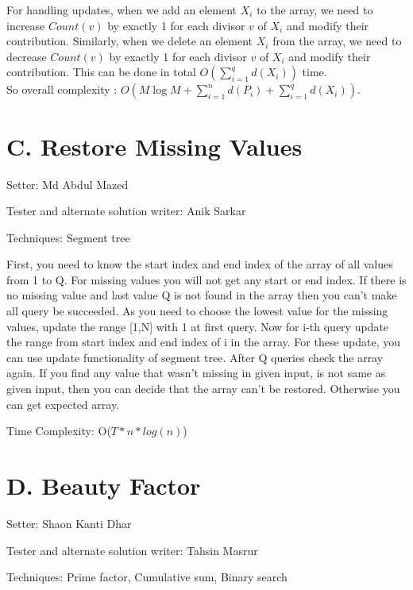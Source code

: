 \documentclass{article}
\begin{document}
For handling updates, when we add an element $X_i$ to the array, we need to increase $Count(v)$ by exactly 1 for each divisor $v$ of $X_i$ and modify their contribution. Similarly, when we delete an element $X_i$ from the array, we need to decrease $Count(v)$ by exactly 1 for each divisor $v$ of $X_i$ and modify their contribution. This can be done in total $O(\sum_{i=1}^{q} d(X_i))$ time.\\

So overall complexity : $O(M \log M + \sum_{i=1}^{n} d(P_i) + \sum_{i=1}^{q} d(X_i))$.

\section*{C. Restore Missing Values}
\noindent Setter: Md Abdul Mazed

\noindent Tester and alternate solution writer: Anik Sarkar

\noindent Techniques: Segment tree
\vspace{0.5cm}

First, you need to know the start index and end index of the array of all values from 1 to Q. For missing values you will not get any start or end index. If there is no missing value and last value Q is not found in the array then you can't make all query be succeeded. As you need to choose the lowest value for the missing values, update the range [1,N] with 1 at first query. Now for i-th query update the range from start index and end index of i in the array. For these update, you can use update functionality of segment tree. After Q queries check the array again. If you find any value that wasn't missing in given input, is not same as given input, then you can decide that the array can't be restored. Otherwise you can get expected array. 

\vspace{0.5cm}

\noindent Time Complexity: O($T*n*log(n)$)

\section*{D. Beauty Factor}

\noindent Setter: Shaon Kanti Dhar

\noindent Tester and alternate solution writer: Tahsin Masrur

\noindent Techniques: Prime factor, Cumulative sum, Binary search

\vspace{0.5cm}
\end{document}
